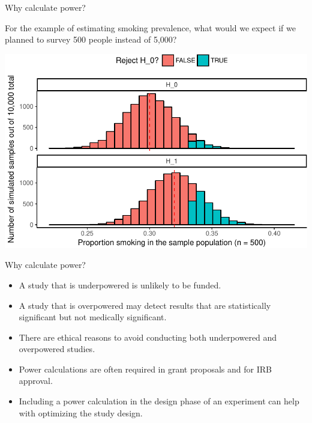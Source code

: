 \documentclass[ignorenonframetext,]{beamer}
\providecommand{\tightlist}{%
  \setlength{\itemsep}{0pt}\setlength{\parskip}{0pt}}
\begin{document}
\begin{frame}{Why calculate power?}

For the example of estimating smoking prevalence, what would we expect
if we planned to survey 500 people instead of 5,000?

\begin{center}\includegraphics[height=0.7\textheight]{sample_size_files/figure-beamer/unnamed-chunk-9-1} \end{center}

\end{frame}

\begin{frame}{Why calculate power?}

\begin{itemize}
\tightlist
\item
  A study that is underpowered is unlikely to be funded.
\item
  A study that is overpowered may detect results that are statistically
  significant but not medically significant.
\item
  There are ethical reasons to avoid conducting both underpowered and
  overpowered studies.
\item
  Power calculations are often required in grant proposals and for IRB
  approval.
\item
  Including a power calculation in the design phase of an experiment can
  help with optimizing the study design.
\end{itemize}

\end{frame}
\end{document}
